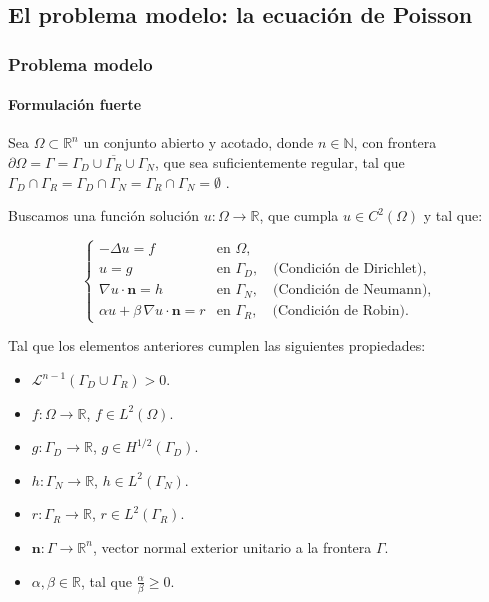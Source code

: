 \documentclass[compress]{beamer}
\begin{document}
\subsection{El problema modelo: la ecuación de Poisson}
\begin{frame}
	\frametitle{Problema modelo}
	\framesubtitle{Formulación fuerte}
	\begin{definition}
	\tiny	
	Sea $\Omega \subset \mathbb{R}^n$ un conjunto abierto y acotado, donde $n \in \mathbb{N}$,
    con frontera $\partial\Omega = \Gamma = \overline{\Gamma_D \cup \Gamma_R \cup \Gamma_N}$, que sea suficientemente regular, tal que $\Gamma_D \cap \Gamma_R = \Gamma_D \cap \Gamma_N =  \Gamma_R \cap \Gamma_N = \emptyset$ .

	Buscamos una función solución $u: \Omega \to \mathbb{R}$, que cumpla $u \in C^2(\Omega)$ y tal que: 

	\[
	\begin{cases}
	- \Delta u = f & \text{en } \Omega, \\[6pt]
	u = g & \text{en } \Gamma_D, \quad \text{(Condición de Dirichlet)}, \\[6pt]
	\nabla u \cdot \mathbf{n} = h & \text{en } \Gamma_N, \quad \text{(Condición de Neumann)}, \\[6pt]
	\alpha u + \beta \, \nabla u \cdot \mathbf{n} = r & \text{en } \Gamma_R, \quad \text{(Condición de Robin)}.
	\end{cases}
	\]

	Tal que los elementos anteriores cumplen las siguientes propiedades:

	\begin{itemize}
		\item $\mathcal{L}^{n-1}(\Gamma_D \cup \Gamma_R) > 0$.
		\item ${f: \Omega \to \mathbb{R}}$, $f \in L^2(\Omega)$.
		\item ${g: \Gamma_D \to \mathbb{R}}$, $g \in H^{1/2}(\Gamma_D)$.
		\item ${h: \Gamma_N \to \mathbb{R}}$, $h \in L^2(\Gamma_N)$.
		\item ${r: \Gamma_R \to \mathbb{R}}$, $r \in L^2(\Gamma_R)$.
		\item ${\mathbf{n}: \Gamma \to \mathbb{R}^n}$, vector normal exterior unitario a la frontera $\Gamma$.
		\item ${\alpha, \beta \in \mathbb{R}}$, tal que $\frac{\alpha}{\beta} \geq 0$.
	\end{itemize}
	\end{definition}
\end{frame}
\end{document}
